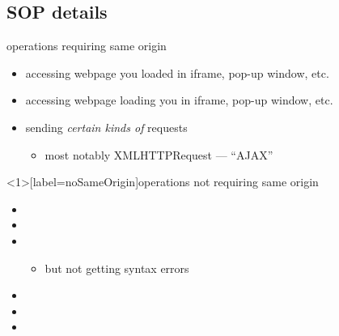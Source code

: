 
\subsection{SOP details}

\begin{frame}{operations requiring same origin}
    \begin{itemize}
    \item accessing webpage you loaded in iframe, pop-up window, etc.
    \item accessing webpage loading you in iframe, pop-up window, etc.
    \item sending \textit{certain kinds of} requests
        \begin{itemize}
        \item most notably XMLHTTPRequest --- ``AJAX''
        \end{itemize}
    \end{itemize}
\end{frame}

\begin{frame}<1>[label=noSameOrigin]{operations not requiring same origin}
    \begin{itemize}
    \item {}
    \item {}
    \item {}
        \begin{itemize}
        \item but not getting syntax errors
        \end{itemize}
    \item {}
    \item {}
    \item {}
    \end{itemize}
\end{frame}




